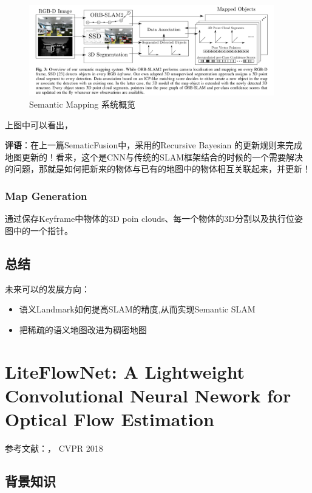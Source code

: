 \begin{figure}[!hbtp]
\centering
\includegraphics[width=0.95\textwidth]{SemanticSLAM/OrientedMap1.png}
\caption{Semantic Mapping 系统概览}
\label{OrientedMap1}
\end{figure}

上图中可以看出，


{\color{red} \textbf{评语}：在上一篇SematicFusion中，采用的Recursive Bayesian 的更新规则来完成地图更新的！看来，这个是CNN与传统的SLAM框架结合的时候的一个需要解决的问题，那就是如何把新来的物体与已有的地图中的物体相互关联起来，并更新！}

\subsubsection{Map Generation}

通过保存Keyframe中物体的3D poin clouds、每一个物体的3D分割以及执行位姿图中的一个指针。

\subsection{总结}

未来可以的发展方向：
\begin{itemize}
\item 语义Landmark如何提高SLAM的精度,从而实现Semantic SLAM
\item 把稀疏的语义地图改进为稠密地图
\end{itemize}

\section[LiteFlowNet]{LiteFlowNet: A Lightweight Convolutional Neural Nework for Optical Flow Estimation}

参考文献：\cite{Hui2018LiteFlowNet}， CVPR 2018

\subsection{背景知识}

